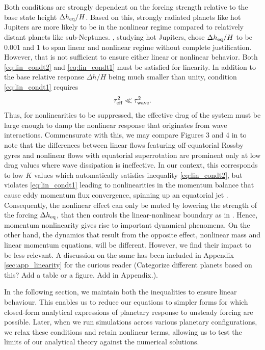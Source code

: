 \documentclass[trackchanges,twocolumn]{aastex7}
\begin{document}
Both conditions are strongly dependent on the forcing strength relative to the base state height $\Delta h_{\rm eq}/H$. Based on this, strongly radiated planets like hot Jupiters are more likely to be in the nonlinear regime compared to relatively distant planets like sub-Neptunes. \cite{perez2013atmospheric}, studying hot Jupiters, chose $\Delta h_{\rm eq}/H$ to be 0.001 and 1 to span linear and nonlinear regime without complete justification. However, that is not sufficient to ensure either linear or nonlinear behavior. Both \eqref{eq:lin_condt2} and \eqref{eq:lin_condt1} must be satisfied for linearity. In addition to the base relative response $\Delta h/H$ being much smaller than unity, condition \eqref{eq:lin_condt1} requires 
\begin{equation}
    \tau_{\rm eff}^2 \ll \tau_{\rm wave}^2.
    \label{eq:condt_inertial}
\end{equation}
Thus, for nonlinearities to be suppressed, the effective drag of the system must be large enough to damp the nonlinear response that originates from wave interactions. Commensurate with this, we may compare Figures 3 and 4 in \cite{perez2013atmospheric} to note that the differences between linear flows featuring off-equatorial Rossby gyres and nonlinear flows with equatorial superrotation are prominent only at low drag values where wave dissipation is ineffective. In our context, this corresponds to low $K$ values which automatically satisfies inequality \eqref{eq:lin_condt2}, but violates \eqref{eq:lin_condt1} leading to nonlinearities in the momentum balance that cause eddy momentum flux convergence, spinning up an equatorial jet \citep{showman2011equatorial}. Consequently, the nonlinear effect can only be muted by lowering the strength of the forcing $\Delta h_{\rm eq}$, that then controls the linear-nonlinear boundary as in \cite{perez2013atmospheric}. Hence, momentum nonlinearity gives rise to important dynamical phenomena. On the other hand, the dynamics that result from the opposite effect, nonlinear mass and linear momentum equations, will be different. However, we find their impact to be less relevant. A discussion on the same has been included in Appendix \ref{sec:app_linearity} for the curious reader {\color{red}(Categorize different planets based on this? Add a table or a figure. Add in Appendix.)}.

In the following section, we maintain both the inequalities to ensure linear behaviour. This enables us to reduce our equations to simpler forms for which closed-form analytical expressions of planetary response to unsteady forcing are possible. Later, when we run simulations across various planetary configurations, we relax these conditions and retain nonlinear terms, allowing us to test the limits of our analytical theory against the numerical solutions.
\end{document}
